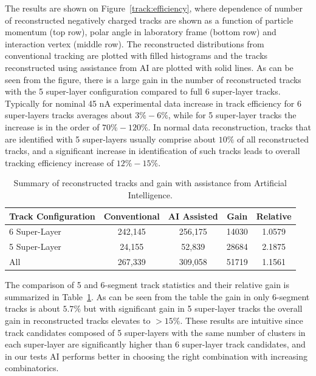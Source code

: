 The results are shown on Figure~\ref{track:efficiency}, where dependence of number of reconstructed negatively charged 
 tracks are shown as a function of particle momentum (top row), polar angle in laboratory frame (bottom row) and interaction
 vertex (middle row). The reconstructed distributions from conventional tracking are plotted with filled histograms and the
 tracks reconstructed using assistance from AI are plotted with solid lines. As can be seen from the figure, there is a large gain 
 in the number of reconstructed tracks with the 5 super-layer configuration compared to full 6 super-layer tracks. Typically for nominal 
 45 nA experimental data increase in track efficiency for 6 super-layers tracks averages about $3\%-6\%$, while for 5 super-layer
 tracks the increase is in the order of $70\%-120\%$. In normal data reconstruction, tracks that are identified with 5 super-layers
 usually comprise about $10\%$ of all reconstructed tracks, and a significant increase in identification of such tracks leads to 
 overall tracking efficiency increase of $12\%-15\%$. 
 
 \begin{table}[!h]
 \begin{center}
 \begin{tabular}{|l|c|c|c|c|}
 \hline
 Track Configuration & Conventional & AI Assisted & Gain & Relative \\
 \hline
 \hline
 6 Super-Layer & 242,145 & 256,175 & 14030 & 1.0579 \\
 5 Super-Layer & 24,155 & 52,839 & 28684 & 2.1875 \\
 All & 267,339 & 309,058 & 51719 & 1.1561 \\
 \hline
 \end{tabular}
 \end{center}
 \caption{Summary of reconstructed tracks and gain with assistance from Artificial Intelligence.}
 \label{tbl:summary}
 \end{table}
 
The comparison of 5 and 6-segment track statistics and their relative gain is summarized in Table~\ref{tbl:summary}.
As can be seen from the table the gain in only 6-segment tracks is about $5.7\%$ but with significant gain in 5 super-layer tracks 
the overall gain in reconstructed tracks elevates to $>15\%$. These results are intuitive since track candidates composed of 5
super-layers with the same number of clusters in each super-layer are significantly higher than 6 super-layer track candidates, and 
in our tests AI performs better in choosing the right combination with increasing combinatorics.
 
